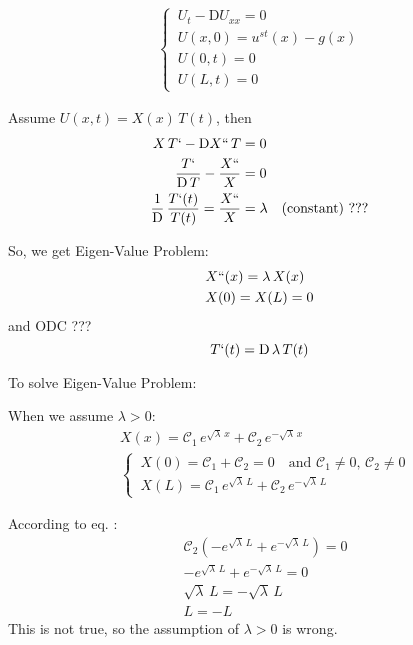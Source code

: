 \documentclass[../main.tex]{subfiles}
\begin{document}
\begin{align}
    \begin{cases}
    \, U_t - \mathrm{D} U_{xx} = 0 \\
    \, U(x,0) = u^{st}(x) - g(x) \\
    \, U(0,t) = 0 \\
    \, U(L,t) = 0
    \end{cases}
\end{align}

Assume $U(x,t) = X(x) \, T(t)$, then
\begin{align}
    X \, T` - \mathrm{D} X`` \, T &= 0 \\
    \frac{T`}{\mathrm{D} \, T} - \frac{X``}{X} &= 0 \\
    \frac{1}{\mathrm{D}} \, \frac{T`(t)}{T(t)} = \frac{X``}{X} &= \lambda \quad \text{(constant) ???}
\end{align}

So, we get Eigen-Value Problem:
\begin{align}
    & X``(x) = \lambda \, X(x) \\
    & X(0) = X(L) = 0
\end{align}
and ODC ???
\begin{equation}
    T`(t) = \mathrm{D} \, \lambda \, T(t)
\end{equation}

To solve Eigen-Value Problem:

When we assume $\lambda > 0$:
\begin{align}
    & X(x) = \mathcal{C}_1 \, e^{\sqrt{\lambda} \, x} + \mathcal{C}_2 \, e^{- \sqrt{\lambda} \, x} \\
    & \begin{cases}
        \, X(0) = \mathcal{C}_1 + \mathcal{C}_2 = 0 \quad \text{and } \mathcal{C}_1 \neq 0 \text{, } \mathcal{C}_2 \neq 0 \\
        \, X(L) = \mathcal{C}_1 \, e^{\sqrt{\lambda} \, L} + \mathcal{C}_2 \, e^{- \sqrt{\lambda} \, L}
    \end{cases}
\end{align}

According to eq. :
\begin{align}
    & \mathcal{C}_2 (- e^{\sqrt{\lambda} \, L} + e^{- \sqrt{\lambda} \, L}) = 0 \\
    & - e^{\sqrt{\lambda} \, L} + e^{- \sqrt{\lambda} \, L} = 0 \\
    & \sqrt{\lambda} \, L = - \sqrt{\lambda} \, L \\
    & L = - L
\end{align}
This is not true, so the assumption of $\lambda > 0$ is wrong.
\end{document}
